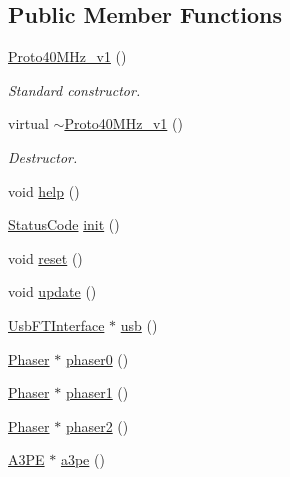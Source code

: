 \subsection*{Public Member Functions}
\begin{DoxyCompactItemize}
\item 
\hyperlink{classProto40MHz__v1_ac78306552cc5dcff551d03cda7a12c0f}{Proto40\+M\+Hz\+\_\+v1} ()
\begin{DoxyCompactList}\small\item\em Standard constructor. \end{DoxyCompactList}\item 
virtual \hyperlink{classProto40MHz__v1_a000cf963b1c194daf39b5f54f4ad0a62}{$\sim$\+Proto40\+M\+Hz\+\_\+v1} ()
\begin{DoxyCompactList}\small\item\em Destructor. \end{DoxyCompactList}\item 
void \hyperlink{classProto40MHz__v1_ae775987179848b4bc257473be261d24c}{help} ()
\item 
\hyperlink{classStatusCode}{Status\+Code} \hyperlink{classProto40MHz__v1_a60c96d57ae30bf6dcf9e4778294ca55c}{init} ()
\item 
void \hyperlink{classProto40MHz__v1_a321b46479def2e28e5727117cb5e05a1}{reset} ()
\item 
void \hyperlink{classProto40MHz__v1_a862d752dfe341ad00eea6f9d8dbc8525}{update} ()
\item 
\hyperlink{classUsbFTInterface}{Usb\+F\+T\+Interface} $\ast$ \hyperlink{classProto40MHz__v1_aee48500fba238c4caf8502db32ebb991}{usb} ()
\item 
\hyperlink{classPhaser}{Phaser} $\ast$ \hyperlink{classProto40MHz__v1_a545f205296c492530a50febd54584f73}{phaser0} ()
\item 
\hyperlink{classPhaser}{Phaser} $\ast$ \hyperlink{classProto40MHz__v1_a9c4ef3187b86b74b05bdec3c167a405e}{phaser1} ()
\item 
\hyperlink{classPhaser}{Phaser} $\ast$ \hyperlink{classProto40MHz__v1_a59defd14376765f7df8f87d594170527}{phaser2} ()
\item 
\hyperlink{classA3PE}{A3\+PE} $\ast$ \hyperlink{classProto40MHz__v1_a263cfc900aafa3ceee1af4b596a824de}{a3pe} ()
\end{DoxyCompactItemize}

